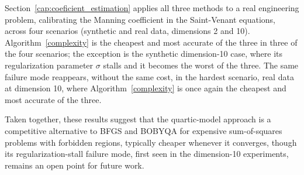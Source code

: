 \documentclass[11pt]{article}
\begin{document}
Section~\ref{cap:coeficient_estimation} applies all three methods to a
real engineering problem, calibrating the Manning coefficient in the
Saint-Venant equations, across four scenarios (synthetic and real
data, dimensions 2 and 10). Algorithm~\ref{complexity} is the cheapest
and most accurate of the three in three of the four scenarios; the
exception is the synthetic dimension-10 case, where its regularization
parameter $\sigma$ stalls and it becomes the worst of the three. The
same failure mode reappears, without the same cost, in the hardest
scenario, real data at dimension 10, where Algorithm~\ref{complexity}
is once again the cheapest and most accurate of the three.

Taken together, these results suggest that the quartic-model approach
is a competitive alternative to BFGS and BOBYQA for expensive
sum-of-squares problems with forbidden regions, typically cheaper
whenever it converges, though its regularization-stall failure mode,
first seen in the dimension-10 experiments, remains an open point for
future work.
\end{document}
